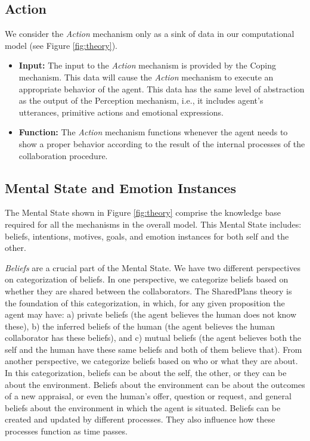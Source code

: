 \documentclass[12pt]{report}
\begin{document}
\subsection{Action}

We consider the \textit{Action} mechanism only as a sink of data in our
computational model (see Figure \ref{fig:theory}).

\begin{itemize}
  \item \textbf{Input:} The input to the \textit{Action} mechanism is provided by
  the Coping mechanism. This data will cause the \textit{Action} mechanism to
  execute an appropriate behavior of the agent. This data has the same level of
  abstraction as the output of the Perception mechanism, i.e., it includes agent's
  utterances, primitive actions and emotional expressions.
  
  \item \textbf{Function:} The \textit{Action} mechanism functions whenever the
  agent needs to show a proper behavior according to the result of the internal
  processes of the collaboration procedure.
\end{itemize}

\subsection{Mental State and Emotion Instances}
\label{sec:mental-states}
The Mental State shown in Figure \ref{fig:theory} comprise the knowledge
base required for all the mechanisms in the overall model. {\color{red}This
Mental State includes: beliefs, intentions, motives, goals, and emotion
instances for both self and the other.}

\textit{Beliefs} are a crucial part of the Mental State. We have two different
perspectives on categorization of beliefs. In one perspective, we categorize
beliefs based on whether they are shared between the collaborators. The
SharedPlans \cite{grosz:plans-discourse} theory is the foundation of this
categorization, in which, for any given proposition the agent may have: a)
private beliefs (the agent believes the human does not know these), b) the
inferred beliefs of the human (the agent believes the human collaborator has
these beliefs), and c) mutual beliefs (the agent believes both the self and the
human have these same beliefs and both of them believe that). From another
perspective, we categorize beliefs based on who or what they are about. In this
categorization, beliefs can be about the self, the other, or they can be about
the environment. {\color{red}Beliefs about the environment can be about the
outcomes of a new appraisal, or even the human's offer, question or request, and
general beliefs about the environment in which the agent is situated.} Beliefs
can be created and updated by different processes. They also influence how these
processes function as time passes.
\end{document}
